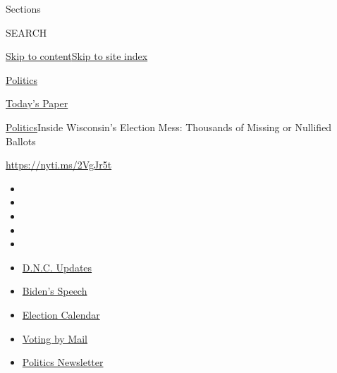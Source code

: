 Sections

SEARCH

\protect\hyperlink{site-content}{Skip to
content}\protect\hyperlink{site-index}{Skip to site index}

\href{https://www.nytimes3xbfgragh.onion/section/politics}{Politics}

\href{https://myaccount.nytimes3xbfgragh.onion/auth/login?response_type=cookie\&client_id=vi}{}

\href{https://www.nytimes3xbfgragh.onion/section/todayspaper}{Today's
Paper}

\href{/section/politics}{Politics}\textbar{}Inside Wisconsin's Election
Mess: Thousands of Missing or Nullified Ballots

\url{https://nyti.ms/2VgJr5t}

\begin{itemize}
\item
\item
\item
\item
\item
\end{itemize}

\begin{itemize}
\item
  \href{https://www.nytimes3xbfgragh.onion/live/2020/08/20/us/dnc-convention-election?action=click\&pgtype=Article\&state=default\&region=TOP_BANNER\&context=storylines_menu}{D.N.C.
  Updates}
\item
  \href{https://www.nytimes3xbfgragh.onion/2020/08/20/us/politics/biden-presidential-nomination-dnc.html?action=click\&pgtype=Article\&state=default\&region=TOP_BANNER\&context=storylines_menu}{Biden's
  Speech}
\item
  \href{https://www.nytimes3xbfgragh.onion/interactive/2019/us/elections/2020-presidential-election-calendar.html?action=click\&pgtype=Article\&state=default\&region=TOP_BANNER\&context=storylines_menu}{Election
  Calendar}
\item
  \href{https://www.nytimes3xbfgragh.onion/interactive/2020/08/11/us/politics/vote-by-mail-us-states.html?action=click\&pgtype=Article\&state=default\&region=TOP_BANNER\&context=storylines_menu}{Voting
  by Mail}
\item
  \href{https://www.nytimes3xbfgragh.onion/newsletters/politics?action=click\&pgtype=Article\&state=default\&region=TOP_BANNER\&context=storylines_menu}{Politics
  Newsletter}
\end{itemize}

